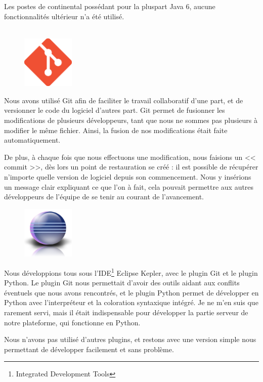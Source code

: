 Les postes de continental possédant pour la pluspart Java 6, aucune fonctionnalités ultérieur n'a été utilisé.\\~

\newpage
\begin{figure}
	\includegraphics[width=2.5cm]{contents/images/logoGit.png}
\end{figure}
Nous avons utilisé Git afin de faciliter le travail collaboratif d'une part, et de versionner le code du logiciel d'autres part. Git permet de fusionner les modifications de plusieurs développeurs, tant que nous ne sommes pas plusieurs à modifier le même fichier. Ainsi, la fusion de nos modifications était faite automatiquement. 

De plus, à chaque fois que nous effectuons une modification, nous faisions un << commit >>, dès lors un point de restauration se créé : il est possible de récupérer n'importe quelle version de logiciel depuis son commencement. Nous y insérions un message clair expliquant ce que l'on à fait, cela pouvait permettre aux autres développeurs de l'équipe de se tenir au courant de l'avancement.

\begin{figure}
	\includegraphics[width=2.5cm]{contents/images/logoEclipse.png}
\end{figure}
Nous développions tous sous l'IDE\footnote{Integrated Development Tools} Eclipse Kepler, avec le plugin Git et le plugin Python. Le plugin Git nous permettait d'avoir des outils aidant aux conflits éventuels que nous avons rencontrés, et le plugin Python permet de développer en Python avec l'interpréteur et la coloration syntaxique intégré. Je ne m'en suis que rarement servi, mais il était indispensable pour développer la partie serveur de notre plateforme, qui fonctionne en Python.

Nous n'avons pas utilisé d'autres plugins, et restons avec une version simple nous permettant de développer facilement et sans problème.

